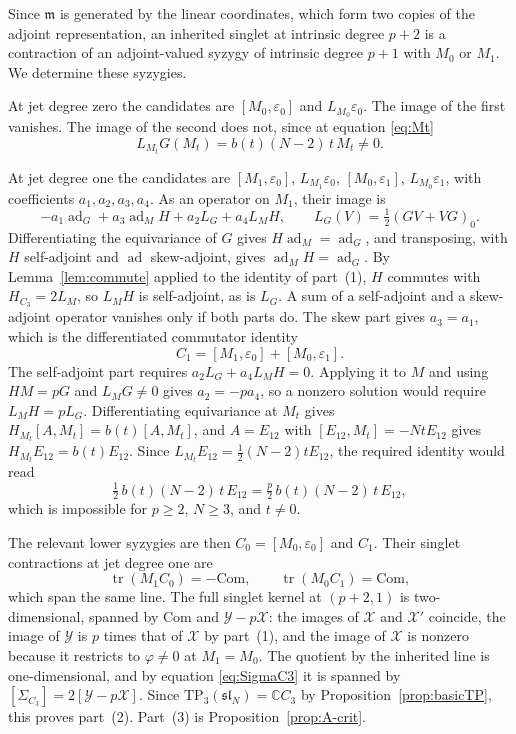 \documentclass[10pt,reqno]{amsart}
\numberwithin{equation}{section}
\theoremstyle{plain}
\theoremstyle{definition}
\DeclareMathOperator{\tr}{tr}
\DeclareMathOperator{\ad}{ad}
\newcommand{\TP}{\mathrm{TP}}
\begin{document}
Since $\mathfrak{m}$ is generated by the linear coordinates, which form two copies of the adjoint representation, an inherited singlet at intrinsic degree $p+2$ is a contraction of an adjoint-valued syzygy of intrinsic degree $p+1$ with $M_0$ or $M_1$. We determine these syzygies.

At jet degree zero the candidates are $[M_0,\varepsilon_0]$ and $L_{M_0}\varepsilon_0$. The image of the first vanishes. The image of the second does not, since at equation \eqref{eq:Mt}
\begin{equation*}
	L_{M_t}G(M_t)=b(t)(N-2)\,t\,M_t\neq0 .
\end{equation*}

At jet degree one the candidates are $[M_1,\varepsilon_0]$, $L_{M_1}\varepsilon_0$, $[M_0,\varepsilon_1]$, $L_{M_0}\varepsilon_1$, with coefficients $a_1,a_2,a_3,a_4$. As an operator on $M_1$, their image is
\begin{equation*}
	-a_1\ad_G+a_3\ad_MH+a_2L_G+a_4L_MH,\qquad L_G(V)=\tfrac12(GV+VG)_0 .
\end{equation*}
Differentiating the equivariance of $G$ gives $H\ad_M=\ad_G$, and transposing, with $H$ self-adjoint and $\ad$ skew-adjoint, gives $\ad_MH=\ad_G$. By Lemma~\ref{lem:commute} applied to the identity of part~(1), $H$ commutes with $H_{C_3}=2L_M$, so $L_MH$ is self-adjoint, as is $L_G$. A sum of a self-adjoint and a skew-adjoint operator vanishes only if both parts do. The skew part gives $a_3=a_1$, which is the differentiated commutator identity
\begin{equation*}
	C_1=[M_1,\varepsilon_0]+[M_0,\varepsilon_1].
\end{equation*}
The self-adjoint part requires $a_2L_G+a_4L_MH=0$. Applying it to $M$ and using $HM=pG$ and $L_MG\neq0$ gives $a_2=-pa_4$, so a nonzero solution would require $L_MH=pL_G$. Differentiating equivariance at $M_t$ gives $H_{M_t}[A,M_t]=b(t)[A,M_t]$, and $A=E_{12}$ with $[E_{12},M_t]=-NtE_{12}$ gives $H_{M_t}E_{12}=b(t)E_{12}$. Since $L_{M_t}E_{12}=\tfrac12(N-2)tE_{12}$, the required identity would read
\begin{equation*}
	\tfrac12\,b(t)(N-2)\,t\,E_{12}=\tfrac p2\,b(t)(N-2)\,t\,E_{12},
\end{equation*}
which is impossible for $p\ge2$, $N\ge3$, and $t\neq0$.

The relevant lower syzygies are then $C_0=[M_0,\varepsilon_0]$ and $C_1$. Their singlet contractions at jet degree one are
\begin{equation*}
	\tr(M_1C_0)=-\mathrm{Com},\qquad \tr(M_0C_1)=\mathrm{Com},
\end{equation*}
which span the same line. The full singlet kernel at $(p+2,1)$ is two-dimensional, spanned by $\mathrm{Com}$ and $\mathcal{Y}-p\mathcal{X}$: the images of $\mathcal{X}$ and $\mathcal{X}'$ coincide, the image of $\mathcal{Y}$ is $p$ times that of $\mathcal{X}$ by part~(1), and the image of $\mathcal{X}$ is nonzero because it restricts to $\varphi\neq0$ at $M_1=M_0$. The quotient by the inherited line is one-dimensional, and by equation \eqref{eq:SigmaC3} it is spanned by $[\Sigma_{C_3}]=2[\mathcal{Y}-p\mathcal{X}]$. Since $\TP_3(\mathfrak{sl}_N)=\mathbb{C} C_3$ by Proposition~\ref{prop:basicTP}, this proves part~(2). Part~(3) is Proposition~\ref{prop:A-crit}.
\end{document}
